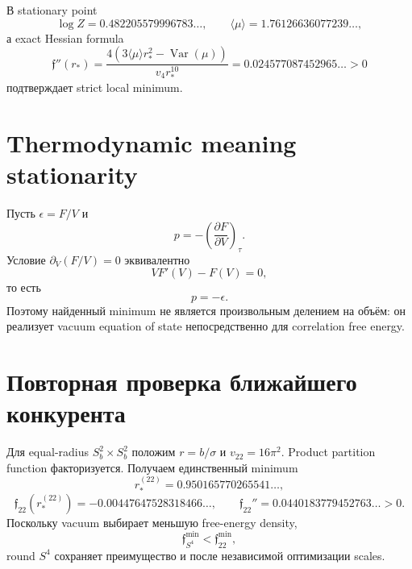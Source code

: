 В stationary point
\begin{equation}
 \log Z=0.482205579996783\ldots,
 \qquad
 \langle\mu\rangle=1.76126636077239\ldots,
\end{equation}
а exact Hessian formula
\begin{equation}
 \mathfrak f''(r_*)
 =\frac{4\left(3\langle\mu\rangle r_*^2
 -\operatorname{Var}(\mu)\right)}{v_4r_*^{10}}
 =0.024577087452965\ldots>0
\end{equation}
подтверждает strict local minimum.

\section{Thermodynamic meaning stationarity}

Пусть \(\epsilon=F/V\) и
\begin{equation}
 p=-\left(\frac{\partial F}{\partial V}\right)_\tau.
\end{equation}
Условие \(\partial_V(F/V)=0\) эквивалентно
\begin{equation}
 VF'(V)-F(V)=0,
\end{equation}
то есть
\begin{equation}
 \boxed{p=-\epsilon}.
 \label{eq:correlation-vacuum-equation-of-state}
\end{equation}
Поэтому найденный minimum не является произвольным делением на объём: он
реализует vacuum equation of state непосредственно для correlation free
energy.

\section{Повторная проверка ближайшего конкурента}

Для equal-radius \(S^2_b\times S^2_b\) положим \(r=b/\sigma\) и
\(v_{22}=16\pi^2\). Product partition function факторизуется. Получаем
единственный minimum
\begin{equation}
 r_*^{(22)}=0.950165770265541\ldots,
\end{equation}
\begin{equation}
 \mathfrak f_{22}(r_*^{(22)})
 =-0.00447647528318466\ldots,
 \qquad
 \mathfrak f_{22}''=0.0440183779452763\ldots>0.
\end{equation}
Поскольку vacuum выбирает меньшую free-energy density,
\begin{equation}
 \mathfrak f_{S^4}^{\min}<\mathfrak f_{22}^{\min},
\end{equation}
round \(S^4\) сохраняет преимущество и после независимой оптимизации scales.

